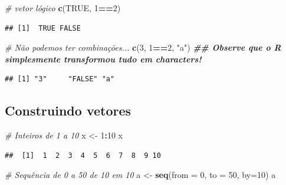\documentclass[
]{book}
\newenvironment{Shaded}{\begin{snugshade}}{\end{snugshade}}
\newcommand{\AttributeTok}[1]{\textcolor[rgb]{0.13,0.29,0.53}{#1}}
\newcommand{\CommentTok}[1]{\textcolor[rgb]{0.56,0.35,0.01}{\textit{#1}}}
\newcommand{\ConstantTok}[1]{\textcolor[rgb]{0.56,0.35,0.01}{#1}}
\newcommand{\DecValTok}[1]{\textcolor[rgb]{0.00,0.00,0.81}{#1}}
\newcommand{\DocumentationTok}[1]{\textcolor[rgb]{0.56,0.35,0.01}{\textbf{\textit{#1}}}}
\newcommand{\FunctionTok}[1]{\textcolor[rgb]{0.13,0.29,0.53}{\textbf{#1}}}
\newcommand{\NormalTok}[1]{#1}
\newcommand{\OtherTok}[1]{\textcolor[rgb]{0.56,0.35,0.01}{#1}}
\newcommand{\SpecialCharTok}[1]{\textcolor[rgb]{0.81,0.36,0.00}{\textbf{#1}}}
\newcommand{\StringTok}[1]{\textcolor[rgb]{0.31,0.60,0.02}{#1}}
\theoremstyle{definition}
\theoremstyle{definition}
\theoremstyle{definition}
\theoremstyle{definition}
\theoremstyle{remark}
\begin{document}
\begin{Shaded}
\begin{Highlighting}[]
\CommentTok{\# vetor lógico}
\FunctionTok{c}\NormalTok{(}\ConstantTok{TRUE}\NormalTok{, }\DecValTok{1}\SpecialCharTok{==}\DecValTok{2}\NormalTok{)}
\end{Highlighting}
\end{Shaded}

\begin{verbatim}
## [1]  TRUE FALSE
\end{verbatim}

\begin{Shaded}
\begin{Highlighting}[]
\CommentTok{\# Não podemos ter combinações...}
\FunctionTok{c}\NormalTok{(}\DecValTok{3}\NormalTok{, }\DecValTok{1}\SpecialCharTok{==}\DecValTok{2}\NormalTok{, }\StringTok{"a"}\NormalTok{) }\DocumentationTok{\#\# Observe que o R simplesmente transformou tudo em characters!}
\end{Highlighting}
\end{Shaded}

\begin{verbatim}
## [1] "3"     "FALSE" "a"
\end{verbatim}

\subsection{Construindo vetores}\label{construindo-vetores}

\begin{Shaded}
\begin{Highlighting}[]
\CommentTok{\# Inteiros de 1 a 10}
\NormalTok{x }\OtherTok{\textless{}{-}} \DecValTok{1}\SpecialCharTok{:}\DecValTok{10}
\NormalTok{x}
\end{Highlighting}
\end{Shaded}

\begin{verbatim}
##  [1]  1  2  3  4  5  6  7  8  9 10
\end{verbatim}

\begin{Shaded}
\begin{Highlighting}[]
\CommentTok{\# Sequência de 0 a 50 de 10 em 10}
\NormalTok{a }\OtherTok{\textless{}{-}} \FunctionTok{seq}\NormalTok{(}\AttributeTok{from =} \DecValTok{0}\NormalTok{, }\AttributeTok{to =} \DecValTok{50}\NormalTok{, }\AttributeTok{by=}\DecValTok{10}\NormalTok{)}
\NormalTok{a}
\end{Highlighting}
\end{Shaded}
\end{document}
